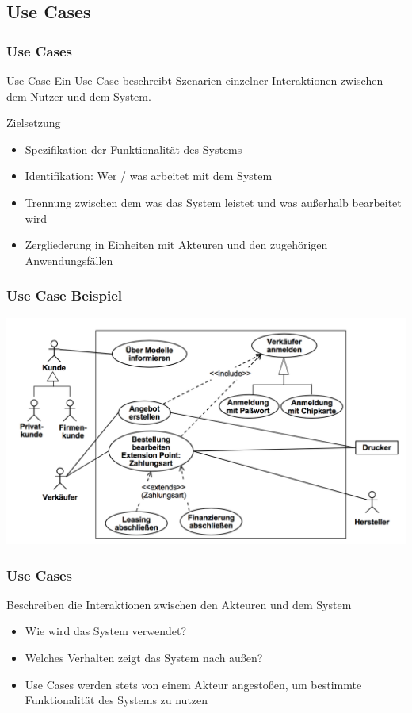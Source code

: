 \subsection{Use Cases}
\begin{frame}
\frametitle{Use Cases}
	\begin{block}{Use Case}
		Ein Use Case beschreibt Szenarien einzelner Interaktionen zwischen dem Nutzer und dem System.
	\end{block}
	\bigskip
	Zielsetzung
	\begin{itemize}
		\item Spezifikation der Funktionalität des Systems
		\item Identifikation: Wer / was arbeitet mit dem System
		\item Trennung zwischen dem was das System leistet und was außerhalb bearbeitet wird
		\item Zergliederung in Einheiten mit Akteuren und den zugehörigen Anwendungsfällen
	\end{itemize}
\end{frame}

\begin{frame}
\frametitle{Use Case Beispiel}
	\center
	\includegraphics[width=1\textwidth,
	keepaspectratio=true]{bilder/use_case_beispiel.png}
\end{frame}

\begin{frame}
\frametitle{Use Cases}
	Beschreiben die Interaktionen zwischen den Akteuren und dem System
	\begin{itemize}
		\item Wie wird das System verwendet?
		\item Welches Verhalten zeigt das System nach außen?
		\item Use Cases werden stets von einem Akteur angestoßen,
					um bestimmte Funktionalität des Systems zu nutzen
	\end{itemize}
\end{frame}

